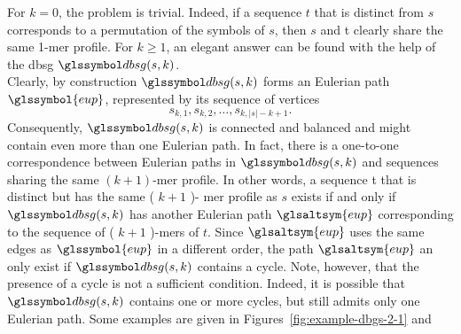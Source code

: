 For $k = 0$, the problem is trivial.
Indeed, if a sequence $t$ that is distinct from $s$ corresponds to a permutation of the symbols of $s$, then $s$ and t clearly share the same 1-mer profile.
For $k \geq 1$, an elegant answer can be found with the help of the \gls{dbsg} $\dbg(s, k)$. \\ \newline Clearly, by construction $\dbg(s, k)$ forms an Eulerian path $\glssymbol{eup}$, represented by its sequence of vertices
\[
    s_{k,1}, s_{k,2}, \dots, s_{k, |s| -k+1}.
\]
Consequently, $\dbg(s, k)$ is connected and balanced and might contain even more than one Eulerian path.
In fact, there is a one-to-one correspondence between Eulerian paths in $\dbg(s, k)$ and sequences sharing the same $(k + 1)$-mer profile.
In other words, a sequence t that is distinct but has the same ( $k+1$ )- mer profile as $s$ exists if and only if $\dbg(s, k)$ has another Eulerian path $\glsaltsym{eup}$ corresponding to the sequence of ( $k+1$ )-mers of $t$.
Since $\glsaltsym{eup} $ uses the same edges as $\glssymbol{eup}$ in a different order, the path $\glsaltsym{eup} $ an only exist if $\dbg(s, k)$ contains a cycle.
Note, however, that the presence of a cycle is not a sufficient condition.
Indeed, it is possible that $\dbg(s, k)$ contains one or more cycles, but still admits only one Eulerian path.
Some examples are given in Figures~\ref{fig:example-dbgs-2-1} and %



